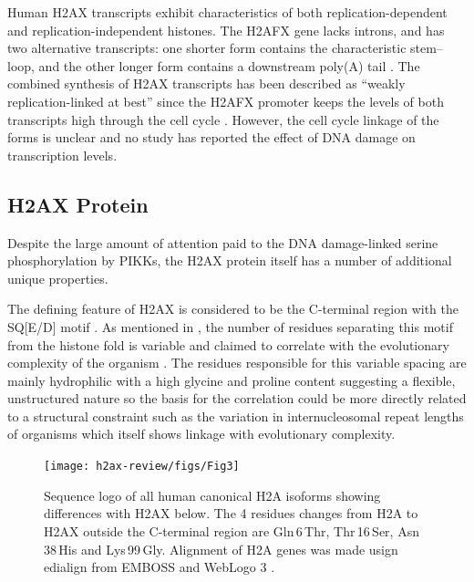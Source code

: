Human H2AX transcripts exhibit characteristics of both
replication-dependent and replication-independent histones. The H2AFX
gene lacks introns, and has two alternative transcripts: one shorter
form contains the characteristic stem--loop, and the other longer form
contains a downstream poly(A) tail \citep{HTwoAX-transcripts}
. The combined synthesis of H2AX
transcripts has been described as ``weakly replication-linked at
best'' since the H2AFX promoter keeps the levels of both transcripts
high through the cell cycle \citep{VSI94}. However, the cell cycle
linkage of the forms is unclear and no study has reported the effect
of DNA damage on transcription levels.

\subsection{H2AX Protein}
\label{subsec:h2ax-review:H2AX-protein}
Despite the large amount of attention paid to the DNA damage-linked
serine phosphorylation by PIKKs, the H2AX protein itself has a number
of additional unique properties.

The defining feature of H2AX is considered to be the C-terminal
region with the SQ[E/D]\textPhi{} motif
. As mentioned in
, the number of residues
separating this motif from the histone fold is variable and claimed to
correlate with the evolutionary complexity of the organism
\citep{CRDP+02}. The residues responsible for this variable spacing
are mainly hydrophilic with a high glycine and proline content
suggesting a flexible, unstructured nature so the basis for the
correlation could be more directly related to a structural constraint
such as the variation in internucleosomal repeat lengths of organisms
which itself shows linkage with evolutionary complexity.

\begin{figure}
\centering

\texttt{[image: h2ax-review/figs/Fig3]}
\raggedleft
\caption[Sequence logo of human canonical H2A isoforms and H2AX]%
                   {Sequence logo of all human canonical H2A isoforms
                     showing differences with H2AX below. The 4
                     residues changes from H2A to H2AX outside the
                     C-terminal region are Gln\,6\,Thr, Thr\,16\,Ser,
                     Asn\,38\,His and Lys\,99\,Gly. Alignment of H2A
                     genes was made usign edialign
                     \citep{Mor99} from EMBOSS
                     \citep{RLB00} and WebLogo 3
                     \citep{weblogo}.}%
\label{fig:h2ax-review:H2AX-logo}
\end{figure}

